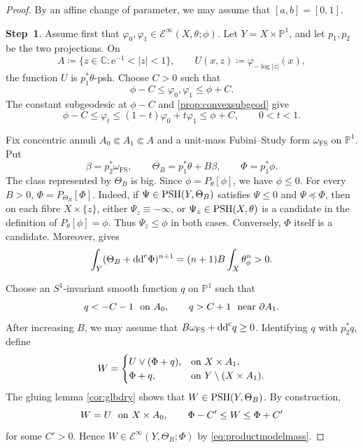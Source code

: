 \begin{proof}
    By an affine change of parameter, we may assume that $[a,b]=[0,1]$.

    \textbf{Step~1}. Assume first that $\varphi_0,\varphi_1\in \mathcal{E}^{\infty}(X,\theta;\phi)$. Let $Y=X\times\mathbb{P}^1$, and let $p_1,p_2$ be the two projections. On
    \[
        A\coloneqq\{z\in\mathbb{C}:\mathrm{e}^{-1}<|z|<1\},
        \qquad U(x,z)\coloneqq\varphi_{-\log|z|}(x),
    \]
    the function $U$ is $p_1^*\theta$-psh. Choose $C>0$ such that
    \[
        \phi-C\leq \varphi_0,\varphi_1\leq\phi+C.
    \]
    The constant subgeodesic at $\phi-C$ and \cref{prop:convexsubgeod} give
    \begin{equation}\label{eq:relgeoduniformbound}
        \phi-C\leq\varphi_t\leq(1-t)\varphi_0+t\varphi_1\leq\phi+C,
        \qquad 0<t<1.
    \end{equation}

    Fix concentric annuli $A_0\Subset A_1\Subset A$ and a unit-mass Fubini--Study form $\omega_{\mathrm{FS}}$ on $\mathbb{P}^1$. Put
    \[
        \beta=p_2^*\omega_{\mathrm{FS}},\qquad
        \Theta_B=p_1^*\theta+B\beta,\qquad
        \Phi=p_1^*\phi.
    \]
    The class represented by $\Theta_B$ is big. Since $\phi=P_\theta[\phi]$, we have $\phi\leq0$. For every $B>0$, $\Phi=P_{\Theta_B}[\Phi]$. Indeed, if $\Psi\in\mathrm{PSH}(Y,\Theta_B)$ satisfies $\Psi\leq0$ and $\Psi\preceq\Phi$, then on each fibre $X\times\{z\}$, either $\Psi_z\equiv-\infty$, or $\Psi_z\in\mathrm{PSH}(X,\theta)$ is a candidate in the definition of $P_\theta[\phi]=\phi$. Thus $\Psi_z\leq\phi$ in both cases. Conversely, $\Phi$ itself is a candidate. Moreover,  gives
    \begin{equation}\label{eq:productmodelmass}
        \int_Y(\Theta_B+\mathrm{dd}^{\mathrm{c}}\Phi)^{n+1}
        =(n+1)B\int_X\theta_\phi^n>0.
    \end{equation}

    Choose an $S^1$-invariant smooth function $q$ on $\mathbb{P}^1$ such that
    \[
        q<-C-1\ \textup{ on }A_0,
        \qquad q>C+1\ \textup{ near }\partial A_1.
    \]
    After increasing $B$, we may assume that $B\omega_{\mathrm{FS}}+\mathrm{dd}^{\mathrm{c}} q\geq0$. Identifying $q$ with $p_2^*q$, define
    \[
        W=
        \begin{cases}
            U\lor(\Phi+q),&\textup{on }X\times A_1,\\
            \Phi+q,&\textup{on }Y\setminus(X\times A_1).
        \end{cases}
    \]
    The gluing lemma \cref{cor:glbdry} shows that $W\in\mathrm{PSH}(Y,\Theta_B)$. By construction,
    \begin{equation}\label{eq:compactgluedpotential}
        W=U\ \textup{ on }X\times A_0,
        \qquad \Phi-C'\leq W\leq\Phi+C'
    \end{equation}
    for some $C'>0$. Hence $W\in\mathcal{E}^{\infty}(Y,\Theta_B;\Phi)$ by \eqref{eq:productmodelmass}.


\end{proof}
